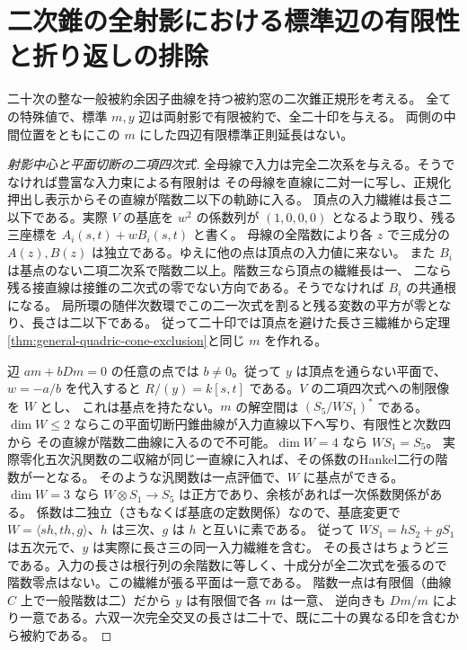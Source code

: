 \section{二次錐の全射影における標準辺の有限性と折り返しの排除}
\label{sec:cone-fold-plucker}
\begin{theorem}\label{thm:cone-fold-plucker}
二十次の整な一般被約余因子曲線を持つ被約窓の二次錐正規形を考える。
全ての特殊値で、標準 $m,y$ 辺は両射影で有限被約で、全二十印を与える。
両側の中間位置をともにこの $m$ にした四辺有限標準正則延長はない。
\end{theorem}
\begin{proof}[射影中心と平面切断の二項四次式]
全母線で入力は完全二次系を与える。そうでなければ豊富な入力束による有限射は
その母線を直線に二対一に写し、正規化押出し表示からその直線が階数二以下の軌跡に入る。
頂点の入力繊維は長さ二以下である。実際 $V$ の基底を $w^2$ の係数列が $(1,0,0,0)$
となるよう取り、残る三座標を $A_i(s,t)+w B_i(s,t)$ と書く。
母線の全階数により各 $z$ で三成分の $A(z),B(z)$ は独立である。ゆえに他の点は頂点の入力値に来ない。
また $B_i$ は基点のない二項二次系で階数二以上。階数三なら頂点の繊維長は一、
二なら残る接直線は接錐の二次式の零でない方向である。そうでなければ $B_i$ の共通根になる。
局所環の随伴次数環でこの二一次式を割ると残る変数の平方が零となり、長さは二以下である。
従って二十印では頂点を避けた長さ三繊維から定理\ref{thm:general-quadric-cone-exclusion}と同じ $m$ を作れる。

辺 $a m+bDm=0$ の任意の点では $b\ne0$。従って $y$ は頂点を通らない平面で、
$w=-a/b$ を代入すると $R/(y)=k[s,t]$ である。$V$ の二項四次式への制限像を $W$ とし、
これは基点を持たない。$m$ の解空間は $(S_5/W S_1)^*$ である。
$\dim W\le2$ ならこの平面切断円錐曲線が入力直線以下へ写り、有限性と次数四から
その直線が階数二曲線に入るので不可能。$\dim W=4$ なら $WS_1=S_5$。
実際零化五次汎関数の二収縮が同じ一直線に入れば、その係数のHankel二行の階数が一となる。
そのような汎関数は一点評価で、$W$ に基点ができる。
$\dim W=3$ なら $W\otimes S_1\to S_5$ は正方であり、余核があれば一次係数関係がある。
係数は二独立（さもなくば基底の定数関係）なので、基底変更で
$W=\langle s h,t h,g\rangle$、$h$ は三次、$g$ は $h$ と互いに素である。
従って $WS_1=hS_2+gS_1$ は五次元で、$y$ は実際に長さ三の同一入力繊維を含む。
その長さはちょうど三である。入力の長さは根行列の余階数に等しく、十成分が全二次式を張るので
階数零点はない。この繊維が張る平面は一意である。
階数一点は有限個（曲線 $C$ 上で一般階数は二）だから $y$ は有限個で各 $m$ は一意、
逆向きも $Dm/m$ により一意である。六双一次完全交叉の長さは二十で、既に二十の異なる印を含むから被約である。
\end{proof}

